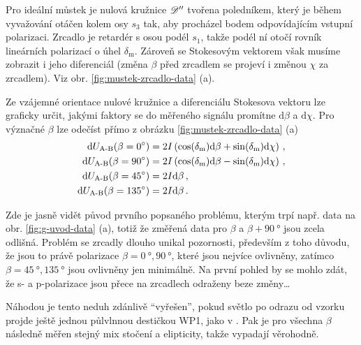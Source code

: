 Pro ideální můstek je nulová kružnice $\mathscr{D}''$ tvořena poledníkem, který je během vyvažování otáčen kolem osy $s_3$ tak, aby procházel bodem odpovídajícím vstupní polarizaci.
Zrcadlo je retardér s osou podél $s_1$, takže podél ní otočí rovník lineárních polarizací o úhel $\delta_\textrm{m}$.
Zároveň se Stokesovým vektorem však musíme zobrazit i jeho diferenciál (změna $\beta$ před zrcadlem se projeví i změnou $\chi$ za zrcadlem).
Viz obr. \ref{fig:mustek-zrcadlo-data} (a).

Ze vzájemné orientace nulové kružnice a diferenciálu Stokesova vektoru lze graficky určit, jakými faktory se do měřeného signálu promítne $\textrm{d}\beta$ a $\textrm{d}\chi$.
Pro význačné $\beta$ lze odečíst přímo z obrázku \ref{fig:mustek-zrcadlo-data} (a)
\begin{align}
    \textrm{d}U_\textrm{A-B}(\beta=\SI{0}{\degree}) &= 2I\left(\cos(\delta_\textrm{m})\textrm{d}\beta + \sin(\delta_\textrm{m})\textrm{d}\chi\right) \,,\\
    \textrm{d}U_\textrm{A-B}(\beta=\SI{90}{\degree}) &= 2I\left(\cos(\delta_\textrm{m})\textrm{d}\beta - \sin(\delta_\textrm{m})\textrm{d}\chi\right) \,,\\
    \textrm{d}U_\textrm{A-B}(\beta=\SI{45}{\degree}) &= 2I\textrm{d}\beta \,, \label{eqn:must-zrc-1}\\
    \textrm{d}U_\textrm{A-B}(\beta=\SI{135}{\degree}) &= 2I\textrm{d}\beta \,. \label{eqn:must-zrc-2}
\end{align}

Zde je jasně vidět původ prvního popsaného problému, kterým trpí např. data na obr. \ref{fig:g-uvod-data} (a), totiž že změřená data pro $\beta$ a $\beta+\SI{90}{\degree}$ jsou zcela odlišná.
Problém se zrcadly dlouho unikal pozornosti, především z toho důvodu, že jsou to právě polarizace $\beta=\SI{0}{\degree}, \SI{90}{\degree}$, které jsou nejvíce ovlivněny, zatímco $\beta=\SI{45}{\degree}, \SI{135}{\degree}$ jsou ovlivněny jen minimálně.
Na první pohled by se mohlo zdát, že s- a p-polarizace jsou přece na zrcadlech odraženy beze změny\ldots

Náhodou je tento neduh zdánlivě ``vyřešen'', pokud světlo po odrazu od vzorku projde ještě jednou půlvlnnou destičkou WP1, jako v \cite{wohlrathMagnetooptickaCharakterizaceSpintronickych2018,kubascikMagnetooptickeStudiumAntiferomagnetickych2019,kimakOptickaSpektroskopieAntiferomagnetu2019}.
Pak je pro všechna $\beta$ následně měřen stejný mix stočení a elipticity, takže vypadají věrohodně.

